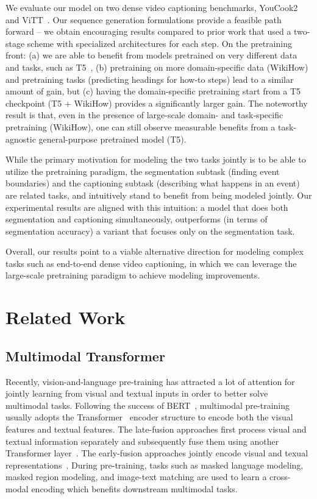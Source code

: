 \documentclass[11pt]{article}
\begin{document}
We evaluate our model on two dense video captioning benchmarks, YouCook2~\citep{ZhXuCoAAAI18} and ViTT~\citep{Huang2020MultimodalPF}.  Our sequence generation formulations provide a feasible path forward -- we obtain encouraging results compared to prior work that used a two-stage scheme with specialized architectures for each step.  On the pretraining front: (a) we are able to benefit from models pretrained on very different data and tasks, such as T5~\cite{t5}, (b) pretraining on more domain-specific data (WikiHow) and pretraining tasks (predicting headings for how-to steps) lead to a similar amount of gain, but (c) having the domain-specific pretraining start from a T5 checkpoint (T5 + WikiHow) provides a significantly larger gain.  
The noteworthy result is that, even in the presence of large-scale domain- and task-specific pretraining (WikiHow), one can still observe measurable benefits from a task-agnostic general-purpose pretrained model (T5).

While the primary motivation for modeling the two tasks jointly is to be able to utilize the pretraining paradigm, the segmentation subtask (finding event boundaries) and the captioning subtask (describing what happens in an event) are related tasks, and intuitively stand to benefit from being modeled jointly.  Our experimental results are aligned with this intuition: a model that does both segmentation and captioning simultaneously, outperforms (in terms of segmentation accuracy) a variant that focuses only on the segmentation task.

Overall, our results point to a viable alternative direction for modeling complex tasks such as end-to-end dense video captioning, in which we can leverage the large-scale pretraining paradigm to achieve modeling improvements. \section{Related Work}

\subsection{Multimodal Transformer}
Recently, vision-and-language pre-training has attracted a lot of attention for jointly learning from visual and textual inputs in order to better solve multimodal tasks. 
Following the success of BERT~\citep{Devlin2019BERTPO}, multimodal pre-training usually adopts the Transformer~\citep{Vaswani2017AttentionIA} encoder structure to encode both the visual features and textual features.
The late-fusion approaches first process visual and textual information separately and subsequently fuse them using another Transformer layer~\citep{Tan2019LXMERTLC, Lu2019ViLBERTPT}. 
The early-fusion approaches jointly encode visual and texual representations~\citep{Chen2020UNITERUI, Sun2019VideoBERTAJ, Li2019VisualBERTAS, Luo2020UniViLMAU, Li2020UnicoderVLAU, Qi2020ImageBERTCP, Huang2020PixelBERTAI, Li2020OscarOA, Lin2020InterBERTVI, Gan2020LargeScaleAT, Kim2021ViLTVT}.
During pre-training, tasks such as masked language modeling, masked region modeling, and image-text matching are used to learn a cross-modal encoding which benefits downstream multimodal tasks. 
\end{document}
